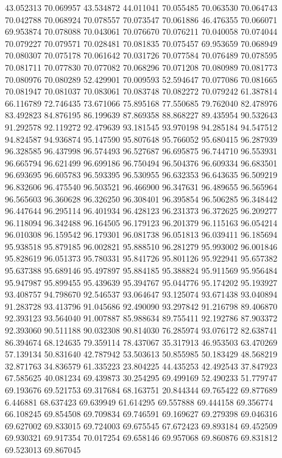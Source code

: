 43.052313
70.069957
43.534872
44.011041
70.055485
70.063530
70.064743
70.042788
70.068924
70.078557
70.073547
70.061886
46.476355
70.066071
69.953874
70.078088
70.043061
70.076670
70.076211
70.040058
70.074044
70.079227
70.079571
70.028481
70.081835
70.075457
69.953659
70.068949
70.080307
70.075178
70.061642
70.031726
70.077584
70.076489
70.078595
70.081711
70.077830
70.077082
70.068296
70.071208
70.080989
70.081773
70.080976
70.080289
52.429901
70.009593
52.594647
70.077086
70.081665
70.081947
70.081037
70.083061
70.083748
70.082272
70.079242
61.387814
66.116789
72.746435
73.671066
75.895168
77.550685
79.762040
82.478976
83.492823
84.876195
86.199639
87.869358
88.868227
89.435954
90.532643
91.292578
92.119272
92.479639
93.181545
93.970198
94.285184
94.547512
94.824587
94.936874
95.147590
95.807648
95.766052
95.680415
96.287939
96.328585
96.437998
96.574493
96.527687
96.695875
96.744710
96.553931
96.665794
96.621499
96.699186
96.750494
96.504376
96.609334
96.683501
96.693695
96.605783
96.593395
96.530955
96.632353
96.643635
96.509219
96.832606
96.475540
96.503521
96.466900
96.347631
96.489655
96.565964
96.565603
96.360628
96.326250
96.308401
96.395854
96.506285
96.348442
96.447644
96.295114
96.401934
96.428123
96.231373
96.372625
96.209277
96.118094
96.342488
96.164505
96.179123
96.201379
96.115163
96.054214
96.010308
96.159542
96.179301
96.081738
96.051813
96.039411
96.185694
95.938518
95.879185
96.002821
95.888510
96.281279
95.993002
96.001846
95.828619
96.051373
95.780331
95.841726
95.801126
95.922941
95.657382
95.637388
95.689146
95.497897
95.884185
95.388824
95.911569
95.956484
95.947987
95.899455
95.439639
95.394767
95.044776
95.174202
95.193927
93.408757
94.798670
92.546537
93.064647
93.125074
93.671438
93.040894
91.283728
93.413796
91.045686
92.490090
93.297842
91.216798
89.406870
92.393123
93.564040
91.007887
85.988634
89.755411
92.192786
87.903372
92.393060
90.511188
90.032308
90.814030
76.285974
93.076172
82.638741
86.394674
68.124635
79.359114
78.437067
35.317913
46.953503
63.470269
57.139134
50.831640
42.787942
53.503613
50.855985
50.183429
48.568219
32.871763
34.836579
61.335223
23.804225
44.435253
42.492543
37.847923
67.585625
40.081234
69.439873
30.254295
69.499169
52.490233
51.779747
69.193676
69.521753
69.317684
68.163751
20.844344
69.765422
69.877689
6.446881
68.637423
69.639949
61.614295
69.557888
69.444158
69.356774
66.108245
69.854508
69.709834
69.746591
69.169627
69.279398
69.046316
69.627002
69.833015
69.724003
69.675545
67.672423
69.893184
69.452509
69.930321
69.917354
70.017254
69.658146
69.957068
69.860876
69.831812
69.523013
69.867045
